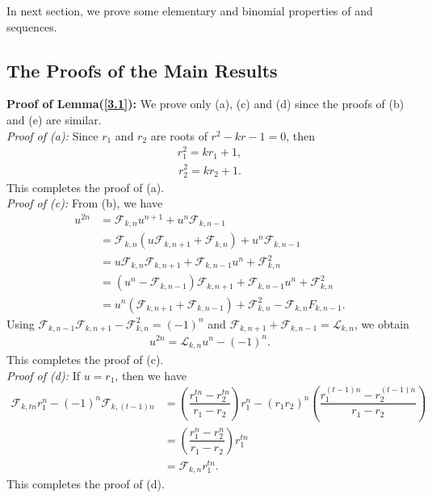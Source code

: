 \noindent In next section, we prove some elementary and binomial properties of \kF\vspace{0mm}  and \kL\vspace{0mm}  sequences. 
\subsection*{{The Proofs of the Main Results}}
\textbf{Proof of Lemma(\ref{3.1}):} We prove only (a), (c) and (d) since the proofs of (b) and (e) are similar.\\
\textit{Proof of (a):}
Since $r_1$ and $r_2$ are roots of $r^2-kr-1=0$, then
\begin{align}\label{4.1}
r_1^2=kr_1+1,
\end{align}
\begin{align}\label{4.2}
r_2^2=kr_2+1.
\end{align}
This completes the proof of (a).\\
\textit{Proof of (c):}
From (b), we have
\begin{align*}
u^{2n}&=\mathcal{F}_{k,n}u^{n+1}+u^n\mathcal{F}_{k,n-1}\\
&=\mathcal{F}_{k,n}(u\mathcal{F}_{k,n+1}+\mathcal{F}_{k,n})+u^n\mathcal{F}_{k,n-1}\\
&=u\mathcal{F}_{k,n}\mathcal{F}_{k,n+1}+\mathcal{F}_{k,n-1}u^n+\mathcal{F}_{k,n}^2\\
&=(u^n-\mathcal{F}_{k,n-1})\mathcal{F}_{k,n+1}+\mathcal{F}_{k,n-1}u^n+\mathcal{F}_{k,n}^2\\
&=u^n(\mathcal{F}_{k,n+1}+\mathcal{F}_{k,n-1})+\mathcal{F}_{k,n}^2-\mathcal{F}_{k,n}F_{k,n-1}.
\end{align*}
Using $\mathcal{F}_{k,n-1}\mathcal{F}_{k,n+1}-\mathcal{F}_{k,n}^2=(-1)^n$ and $\mathcal{F}_{k,n+1}+\mathcal{F}_{k,n-1}=\mathcal{L}_{k,n}$, we obtain
\begin{align*}
u^{2n}=\mathcal{L}_{k,n}u^n-(-1)^n.
\end{align*}
This completes the proof of (c).\\
\textit{Proof of (d):}
If $u=r_1$, then we have
\begin{align*}
\mathcal{F}_{k,tn}r_1^n-(-1)^n\mathcal{F}_{k,(t-1)n}&=(\dfrac{r_1^{tn}-r_2^{tn}}{r_1-r_2})r_1^{n}-(r_1r_2)^n(\dfrac{r_1^{(t-1)n}-r_2^{(t-1)n}}{r_1-r_2})\\
&=(\dfrac{r_1^{n}-r_2^{n}}{r_1-r_2})r_1^{tn}\\
&=\mathcal{F}_{k,n}r_1^{tn}.
\end{align*}
This completes the proof of (d).\\
